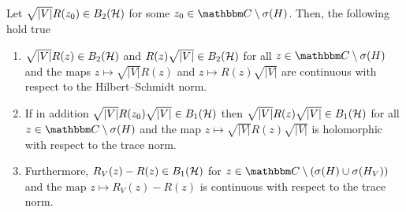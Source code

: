 \begin{lemma}\label{energy00t}
Let $\sqrt{|V|}R(z_0)\in B_2({\mathcal H})$ for some $z_0\in\C\setminus\sigma(H)$.
Then, the following hold true
\begin{enumerate}
\item
$\sqrt{|V|}R(z)\in B_2({\mathcal H})$ and $R(z)\sqrt{|V|}\in B_2({\mathcal H})$ for all $z\in\C\setminus\sigma(H)$
and the maps $z\mapsto\sqrt{|V|}R(z)$ and $z\mapsto R(z)\sqrt{|V|}$ are continuous with respect to the 
Hilbert--Schmidt norm.
\item
If in addition $\sqrt{|V|}R(z_0)\sqrt{|V|}\in B_1({\mathcal H})$ then $\sqrt{|V|}R(z)\sqrt{|V|}\in B_1({\mathcal H})$
for all $z\in\C\setminus\sigma(H)$ and the map $z\mapsto\sqrt{|V|}R(z)\sqrt{|V|}$ is holomorphic
with respect to the trace norm.
\item
Furthermore, $R_V(z)-R(z)\in B_1({\mathcal H})$ for $z\in\C\setminus(\sigma(H)\cup\sigma(H_V))$ and
the map $z\mapsto R_V(z)-R(z)$ is continuous with respect to the trace norm.
\end{enumerate}
\end{lemma}
